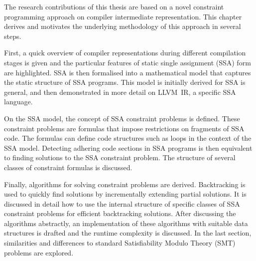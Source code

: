 
    The research contributions of this thesis are based on a novel constraint
    programming approach on compiler intermediate representation.
    This chapter derives and motivates the underlying methodology of this
    approach in several steps.

    First, a quick overview of compiler representations during different
    compilation stages is given and the particular features of static single
    assignment (SSA) form are highlighted.
    SSA is then formalised into a mathematical model that captures the static
    structure of SSA programs.
    This model is initially derived for SSA is general, and then demonstrated in
    more detail on \mbox{LLVM IR}, a specific SSA language.

    On the SSA model, the concept of SSA constraint problems is defined.
    These constraint problems are formulas that impose restrictions on fragments
    of SSA code.
    The formulas can define code structures such as loops in the context of the
    SSA model.
    Detecting adhering code sections in SSA programs is then equivalent to
    finding solutions to the SSA constraint problem.
    The structure of several classes of constraint formulas is discussed.

    Finally, algorithms for solving constraint problems are derived.
    Backtracking is used to quickly find solutions by incrementally extending
    partial solutions.
    It is discussed in detail how to use the internal structure of specific
    classes of SSA constraint problems for efficient backtracking solutions.
    After discussing the algorithms abstractly, an implementation of these
    algorithms with suitable data structures is drafted and the runtime
    complexity is discussed.
    In the last section, similarities and differences to standard Satisfiability
    Modulo Theory (SMT) problems are explored.


